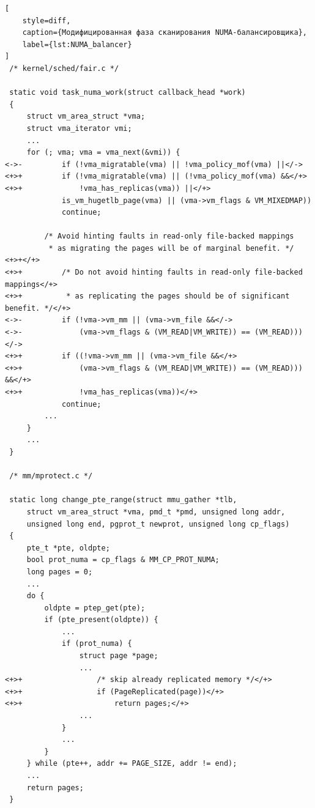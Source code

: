 \begin{lstlisting}[
	style=diff,
	caption={Модифицированная фаза сканирования NUMA-балансировщика},
	label={lst:NUMA_balancer}
]
 /* kernel/sched/fair.c */

 static void task_numa_work(struct callback_head *work)
 {
	 struct vm_area_struct *vma;
	 struct vma_iterator vmi;
	 ...
	 for (; vma; vma = vma_next(&vmi)) {
<->-		 if (!vma_migratable(vma) || !vma_policy_mof(vma) ||</->
<+>+		 if (!vma_migratable(vma) || (!vma_policy_mof(vma) &&</+>
<+>+			 !vma_has_replicas(vma)) ||</+>
			 is_vm_hugetlb_page(vma) || (vma->vm_flags & VM_MIXEDMAP))
			 continue;

		 /* Avoid hinting faults in read-only file-backed mappings
		  * as migrating the pages will be of marginal benefit. */
<+>+</+>
<+>+		 /* Do not avoid hinting faults in read-only file-backed mappings</+>
<+>+		  * as replicating the pages should be of significant benefit. */</+>
<->-		 if (!vma->vm_mm || (vma->vm_file &&</->
<->-			 (vma->vm_flags & (VM_READ|VM_WRITE)) == (VM_READ)))</->
<+>+		 if ((!vma->vm_mm || (vma->vm_file &&</+>
<+>+			 (vma->vm_flags & (VM_READ|VM_WRITE)) == (VM_READ))) &&</+>
<+>+			 !vma_has_replicas(vma))</+>
			 continue;
		 ...
	 }
	 ...
 }

 /* mm/mprotect.c */

 static long change_pte_range(struct mmu_gather *tlb,
	 struct vm_area_struct *vma, pmd_t *pmd, unsigned long addr,
	 unsigned long end, pgprot_t newprot, unsigned long cp_flags)
 {
	 pte_t *pte, oldpte;
	 bool prot_numa = cp_flags & MM_CP_PROT_NUMA;
	 long pages = 0;
	 ...
	 do {
		 oldpte = ptep_get(pte);
		 if (pte_present(oldpte)) {
			 ...
			 if (prot_numa) {
				 struct page *page;
				 ...
<+>+				 /* skip already replicated memory */</+>
<+>+				 if (PageReplicated(page))</+>
<+>+				 	 return pages;</+>
				 ...
			 }
			 ...
		 }
	 } while (pte++, addr += PAGE_SIZE, addr != end);
	 ...
	 return pages;
 }
\end{lstlisting}
\vspace{0.5cm}


